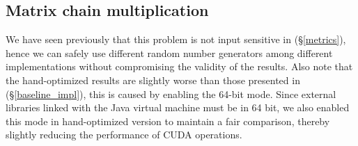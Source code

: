 \def\hh{\normalsize\bf}
\def\hl#1#2{\begin{minipage}{3.5cm} {\bf #1} \\[-2pt] \footnotesize #2 \vspace{6pt} \end{minipage}}
\def\hdps{\hl{DynaProg}{Scala parsers}}
\def\hdpc{\hl{DynaProg}{CUDA parsers}}
\def\hdpcz{\hl{DynaProg}{CUDA-Zuker}}
\def\hdpcr{\hl{DynaProg}{CUDA-RNAfold}}
\def\hhoc{\hl{Optimized}{C, single thread}}
\def\hhog{\hl{Optimized}{CUDA, 64-bit}}
\def\hgapc{\hl{GAPC}{\cite{gapc_thesis}, C, single thread}}
\def\hatlp{\hl{ATLP}{\cite{gpu_atlp}, rescaled results$^{(1)}$}}
\def\hcua{\hl{CUDAlign}{\cite{swat_linear}, version 2.0}}
\def\hvien{\hl{ViennaRNA}{\cite{vienna_rna}}}
\def\hrna{\hl{RNAFold}{\cite{gpu_rnafold}}}

\def\hcpu{\midrule \multirow{4}{*}{\rotatebox{90}{\normalsize\bf CPU $\quad$}}}
\def\hgpu{\midrule \multirow{4}{*}{\rotatebox{90}{\normalsize\bf GPU $\quad$}}}

\subsection{Matrix chain multiplication}
We have seen previously that this problem is not input sensitive in (\S\ref{metrics}), hence we can safely use different random number generators among different implementations without compromising the validity of the results.  Also note that the hand-optimized results are slightly worse than those presented in (\S\ref{baseline_impl}), this is caused by enabling the 64-bit mode. Since external libraries linked with the Java virtual machine must be in 64 bit, we also enabled this mode in hand-optimized version to maintain a fair comparison, thereby slightly reducing the performance of CUDA operations.

